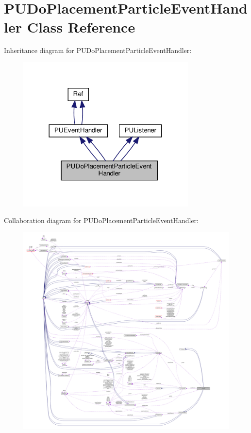 \hypertarget{classPUDoPlacementParticleEventHandler}{}\section{P\+U\+Do\+Placement\+Particle\+Event\+Handler Class Reference}
\label{classPUDoPlacementParticleEventHandler}


Inheritance diagram for P\+U\+Do\+Placement\+Particle\+Event\+Handler\+:
\nopagebreak
\begin{figure}[H]
\begin{center}
\leavevmode
\includegraphics[width=254pt]{classPUDoPlacementParticleEventHandler__inherit__graph}
\end{center}
\end{figure}


Collaboration diagram for P\+U\+Do\+Placement\+Particle\+Event\+Handler\+:
\nopagebreak
\begin{figure}[H]
\begin{center}
\leavevmode
\includegraphics[width=350pt]{classPUDoPlacementParticleEventHandler__coll__graph}
\end{center}
\end{figure}
